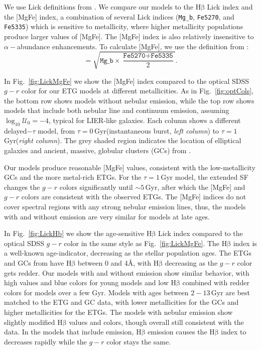 \documentclass[preprint2]{aastex62}
\newcommand{\hb}{\ensuremath{\mathrm{H\beta}}\xspace}
\newcommand{\logten}{\ensuremath{\log_{10}}}
\newcommand{\ang}{\ensuremath{\mbox{\AA}}\xspace}
\newcommand{\logUeq}[1]{\ensuremath{\logten \mathcal{U}_0 = #1}}
\newcommand{\Gyr}{$\,$Gyr\xspace}
\begin{document}
We use Lick definitions from \citet{Vazdekis+2010}. We compare our models to the \hb Lick index and the [MgFe] index, a combination of several Lick indices (\texttt{Mg\_b}, \texttt{Fe5270}, and \texttt{Fe5335}) which is sensitive to metallicity, where higher metallicity populations produce larger values of [MgFe]. The [MgFe] index is also relatively insensitive to $\alpha-$abundance enhancements. To calculate [MgFe], we use the definition from \citet{Galleti+2009}:
\begin{equation}
    [\mathrm{MgFe}] = \sqrt{\texttt{Mg\_b} \times \frac{\texttt{Fe5270} + \texttt{Fe5335}}{2}}.
\end{equation}

In Fig.~\ref{fig:LickMgFe} we show the [MgFe] index compared to the optical SDSS $g-r$ color for our ETG models at different metallicities. As in Fig.~\ref{fig:optCols}, the bottom row shows models without nebular emission, while the top row shows models that include both nebular line and continuum emission, assuming \logUeq{-4}, typical for LIER-like galaxies. Each column shows a different delayed$-\tau$ model, from $\tau=0$\Gyr (instantaneous burst, \emph{left column}) to $\tau=1$\Gyr (\emph{right column}). The grey shaded region indicates the location of elliptical galaxies and ancient, massive, globular clusters (GCs) from \citet{Schombert+2016}.

Our models produce reasonable [MgFe] values, consistent with the low-metallicity GCs and the more metal-rich ETGs. For the $\tau=1$\Gyr model, the extended SF changes the $g-r$ colors significantly until $\sim5$\Gyr, after which the [MgFe] and $g-r$ colors are consistent with the observed ETGs. The [MgFe] indices do not cover spectral regions with any strong nebular emission lines, thus, the models with and without emission are very similar for models at late ages.

In Fig.~\ref{fig:LickHb} we show the age-sensitive \hb Lick index compared to the optical SDSS $g-r$ color in the same style as Fig.~\ref{fig:LickMgFe}. The \hb index is a well-known age-indicator, decreasing as the stellar population ages. The ETGs and GCs from \citet{Schombert+2016} have \hb between 0 and 4\ang, with \hb decreasing as the $g-r$ color gets redder. Our models with and without emission show similar behavior, with high values and blue colors for young models and low \hb combined with redder colors for models over a few Gyr. Models with ages between $2-13$\Gyr are best matched to the ETG and GC data, with lower metallicities for the GCs and higher metallicities for the ETGs. The models with nebular emission show slightly modified \hb values and colors, though overall still consistent with the data. In the models that include emission, \hb emission causes the \hb index to decreases rapidly while the $g-r$ color stays the same.
\end{document}
